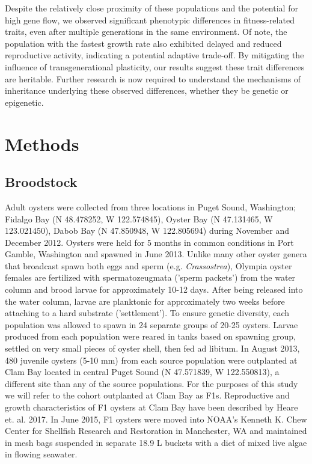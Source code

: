 \documentclass[fleqn,10pt]{wlscirep}
\begin{document}
Despite the relatively close proximity of these populations and the potential for high gene flow, we observed significant phenotypic differences in fitness-related traits, even after multiple generations in the same environment. Of note, the population with the fastest growth rate also exhibited delayed and reduced reproductive activity, indicating a potential adaptive trade-off. By mitigating the influence of transgenerational plasticity, our results suggest these trait differences are heritable. Further research is now required to understand the mechanisms of inheritance underlying these observed differences, whether they be genetic or epigenetic. 

\section*{Methods}
\subsection*{Broodstock}
Adult oysters were collected from three locations in Puget Sound, Washington; Fidalgo Bay (N 48.478252, W 122.574845), Oyster Bay (N 47.131465, W 123.021450), Dabob Bay (N 47.850948, W 122.805694) during November and December 2012. Oysters were held for 5 months in common conditions in Port Gamble, Washington and spawned in June 2013. Unlike many other oyster genera that broadcast spawn both eggs and sperm (e.g. \textit{Crassostrea}), Olympia oyster females are fertilized with spermatozeugmata ('sperm packets') from the water column and brood larvae for approximately 10-12 days. After being released into the water column, larvae are planktonic for approximately two weeks before attaching to a hard substrate ('settlement'). To ensure genetic diversity, each population was allowed to spawn in 24 separate groups of 20-25 oysters. Larvae produced from each population were reared in tanks based on spawning group, settled on very small pieces of oyster shell, then fed ad libitum. In August 2013, 480 juvenile oysters (5-10 mm) from each source population were outplanted at Clam Bay located in central Puget Sound (N 47.571839, W 122.550813), a different site than any of the source populations. For the purposes of this study we will refer to the cohort outplanted at Clam Bay as F1s. Reproductive and growth characteristics of F1 oysters at Clam Bay have been described by Heare et. al. 2017. In June 2015, F1 oysters were moved into NOAA's Kenneth K. Chew Center for Shellfish Research and Restoration in Manchester, WA and maintained in mesh bags suspended in separate 18.9 L buckets with a diet of mixed live algae in flowing seawater.
\end{document}
